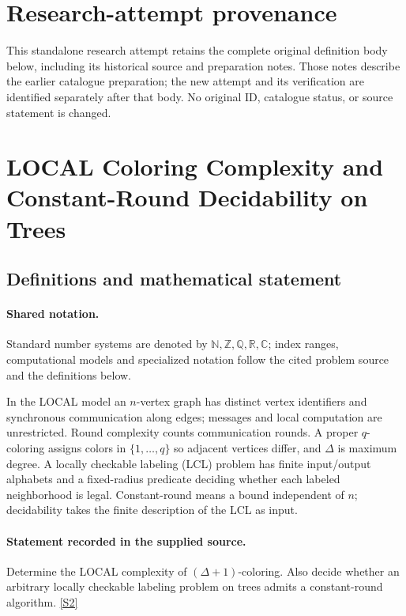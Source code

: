 \documentclass[11pt]{article}
\begin{document}
\section*{Research-attempt provenance}
This standalone research attempt retains the complete original definition body below,
including its historical source and preparation notes. Those notes describe the
earlier catalogue preparation; the new attempt and its verification are identified
separately after that body. No original ID, catalogue status, or source statement is changed.

\section{LOCAL Coloring Complexity and Constant-Round Decidability on Trees}\label{statement}

\subsection{Definitions and mathematical statement}

\paragraph{Shared notation.}Standard number systems are denoted by $\mathbb N,\mathbb Z,\mathbb Q,\mathbb R,\mathbb C$; index ranges, computational models and specialized notation follow the cited problem source and the definitions below.


In the LOCAL model an $n$-vertex graph has distinct vertex identifiers and synchronous communication along edges; messages and local computation are unrestricted. Round complexity counts communication rounds. A proper $q$-coloring assigns colors in $\{1,\ldots,q\}$ so adjacent vertices differ, and $\Delta$ is maximum degree. A locally checkable labeling (LCL) problem has finite input/output alphabets and a fixed-radius predicate deciding whether each labeled neighborhood is legal. Constant-round means a bound independent of $n$; decidability takes the finite description of the LCL as input.
\paragraph{Statement recorded in the supplied source.}
Determine the LOCAL complexity of $(\Delta+1)$-coloring. Also decide whether an arbitrary locally checkable labeling problem on trees admits a constant-round algorithm. \href{https://doi.org/10.4171/owr/2022/8}{[S2]}
\end{document}
